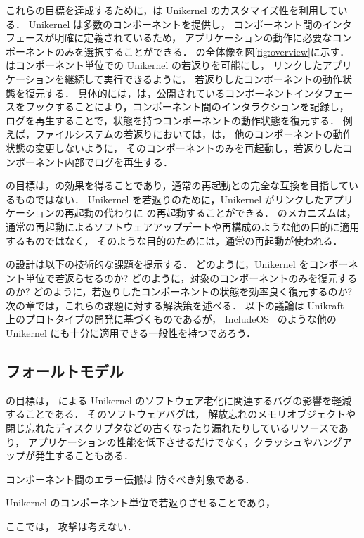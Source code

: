 これらの目標を達成するために，\sysname は Unikernel のカスタマイズ性を利用している．
Unikernel は多数のコンポーネントを提供し，
コンポーネント間のインタフェースが明確に定義されているため，
アプリケーションの動作に必要なコンポーネントのみを選択することができる．
\sysname の全体像を図\ref{fig:overview}に示す．
\sysname はコンポーネント単位での Unikernel の若返りを可能にし，
リンクしたアプリケーションを継続して実行できるように，
若返りしたコンポーネントの動作状態を復元する．
具体的には，\sysname は，公開されているコンポーネントインタフェースをフックすることにより，コンポーネント間のインタラクションを記録し，
ログを再生することで，状態を持つコンポーネントの動作状態を復元する．
例えば，ファイルシステムの若返りにおいては，\sysname は，
他のコンポーネントの動作状態の変更しないように，
そのコンポーネントのみを再起動し，若返りしたコンポーネント内部でログを再生する．

\sysname の目標は，\rr の効果を得ることであり，通常の再起動との完全な互換を目指しているものではない．
Unikernel を若返りのために，Unikernel がリンクしたアプリケーションの再起動の代わりに \sysname の再起動することができる．
\sysname のメカニズムは，
通常の再起動によるソフトウェアアップデートや再構成のような他の目的に適用するものではなく，
そのような目的のためには，通常の再起動が使われる．

\sysname の設計は以下の技術的な課題を提示する．
どのように，Unikernel をコンポーネント単位で若返らせるのか?
どのように，対象のコンポーネントのみを復元するのか?
どのように，若返りしたコンポーネントの状態を効率良く復元するのか?
次の章では，これらの課題に対する解決策を述べる．
以下の議論は Unikraft~\cite{KuenzerEtAl-Unikraft} 上のプロトタイプの開発に基づくものであるが，
IncludeOS~\cite{BratterudEtAl-IncludeOS} のような他の Unikernel にも十分に適用できる一般性を持つであろう．


\subsection{フォールトモデル}

\sysname の目標は，
\rr による Unikernel のソフトウェア老化に関連するバグの影響を軽減することである．
そのソフトウェアバグは，
解放忘れのメモリオブジェクトや閉じ忘れたディスクリプタなどの古くなったり漏れたりしているリソースであり，
アプリケーションの性能を低下させるだけでなく，クラッシュやハングアップが発生することもある．

コンポーネント間のエラー伝搬は
防ぐべき対象である．

Unikernel のコンポーネント単位で若返りさせることであり，

ここでは，
攻撃は考えない．
